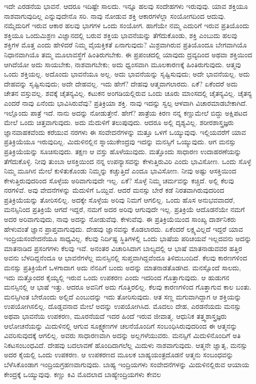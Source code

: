 ಇದೇ ಎರಡನೆಯ ಭಾವನೆ. ಆದರೂ ಇದಿಷ್ಟೇ ಸಾಲದು. ಇನ್ನೂ ಹಲವು ಸಂದೇಹಗಳು ಇರುವುವು. ಯಾವ ಶಕ್ತಿಯೂ ನಾಶವಾಗುವುದಿಲ್ಲ ಎನ್ನುವುದೇನೊ ಸರಿ. ನಾವು ನೋಡುವ ಶಕ್ತಿ ಆಕಾರಗಳೆಲ್ಲಾ ಸಂಯೋಗದಿಂದ ಆದುವು. ನಮ್ಮೆದುರಿಗೆ ಇರುವ ಆಕಾರ ಹಲವು ಭಾಗಗಳ ಒಂದು ಸಂಯೋಗ. ಹಾಗೆಯೇ ನಮ್ಮ ಎದುರಿಗೆ ಇರುವ ಪ್ರತಿಯೊಂದು ಶಕ್ತಿಯೂ ಒಂದುಮಿಶ್ರಣ ವಿಜ್ಞಾನದಲ್ಲಿ ಬರುವ ಶಕ್ತಿಯ ಭಾವನೆಯನ್ನು ತೆಗೆದುಕೊಂಡು, ಶಕ್ತಿ ಎಂಬುದು ಹಲವು ಶಕ್ತಿಗಳ ಮೊತ್ತ ಎಂದು ಹೇಳಿದರೆ ನಿಮ್ಮ ವೈಯಕ್ತಿಕತೆ ಏನಾಗುವುದು? ಮಿಶ್ರವಾಗಿರುವ ಪ್ರತಿಯೊಂದೂ ಬೇಗವಾಗಿಯೊ ನಿಧಾನವಾಗಿಯೊ ತಮ್ಮ ಮೂಲಾವಸ್ಥೆಗೆ ಹಿಂತಿರುಗಬೇಕು. ಈ ಪ್ರಪಂಚದಲ್ಲಿ ಯಾವುದು ದ್ರವ್ಯದಿಂದ ಅಥವಾ ಶಕ್ತಿಯಿಂದ ಆಗಿದೆಯೋ ಅದು ಸಾಯಬೇಕು, ನಾಶವಾಗಬೇಕು; ಅದು ಧ್ವಂಸವಾಗಿ ಮೂಲಕಾರಣಕ್ಕೆ ಹಿಂತಿರುಗುವುದು. ಆತ್ಮವು ಒಂದು ಶಕ್ತಿಯಲ್ಲ. ಅದೊಂದು ಭಾವನೆಯೂ ಅಲ್ಲ. ಅದು ಭಾವನೆಯನ್ನು ಸೃಷ್ಟಿಸುವುದು; ಅದೇ ಭಾವನೆಯಲ್ಲ. ಅದು ದೇಹವನ್ನು ಸೃಷ್ಟಿಸುವುದು; ಅದೇ ದೇಹವಲ್ಲ. ಇದು ಹೇಗೆ? ದೇಹವು ಆತ್ಮವಾಗಲಾರದು. ಏಕೆ? ಏಕೆಂದರೆ ಅದು ಚೇತನ ವಸ್ತುವಲ್ಲ. ಶವಕ್ಕೆ ಚೈತನ್ಯವಿಲ್ಲ. ಕಟುಕನ ಅಂಗಡಿಯಲ್ಲಿರುವ ಒಂದು ಚೂರು ಮಾಂಸದಲ್ಲಿ ಚೈತನ್ಯವಿಲ್ಲ. ಚೈತನ್ಯ ಎಂದರೆ ನಾವು ಏನೆಂದು ಭಾವಿಸಿರುವೆವು? ಪ್ರತಿಕ್ರಿಯಾ ಶಕ್ತಿ. ನಾವು ಇದನ್ನು ಸ್ವಲ್ಪ ಆಳವಾಗಿ ವಿಚಾರಮಾಡಬೇಕಾಗಿದೆ. ಇಲ್ಲೊಂದು ಪಾತ್ರೆ ಇದೆ. ನಾನು ಅದನ್ನು ನೋಡುತ್ತೇನೆ. ಹೇಗೆ? ಪಾತ್ರೆಯ ಕಿರಣ ನನ್ನ ಕಣ್ಣುಮೇಲೆ ಬಿದ್ದು ಅಕ್ಷಿಪಟದ ಮೇಲೆ ಒಂದು ಚಿತ್ತವಾಗುವುದು. ಅದು ಮೆದುಳಿಗೆ ತಲುಪುವುದು. ಆದರೂ ಅಲ್ಲಿ ದೃಶ್ಯವಿಲ್ಲ. ಶರೀರಶಾಸ್ತ್ರಜ್ಞರು ಜ್ಞಾನವಾಹಕವೆಂದು ಕರೆಯುವ ನರಗಳು ಈ ಸಂವೇದನೆಗಳನ್ನು ಮತ್ತೂ ಒಳಗೆ ಒಯ್ಯುವುವು. ಇಲ್ಲಿಯವರೆಗೆ ಯಾವ ಪ್ರತಿಕ್ರಿಯೆಯೂ ಇರುವುದಿಲ್ಲ. ಮಿದುಳಿನಲ್ಲಿನ ಸ್ನಾಯುಕೇಂದ್ರವು ಇದನ್ನು ಮನಸ್ಸಿಗೆ ಒಯ್ಯುವುದು. ಆಗ ಮನಸ್ಸು ಪ್ರತಿಕ್ರಿಯೆಯನ್ನು ಸೂಚಿಸುವುದು. ತಕ್ಷಣ ಆ ವಸ್ತು ಹೊಳೆಯುವುದು. ಮತ್ತೊಂದು ಸಾಧಾರಣ ಉದಾಹರಣೆಯನ್ನು ತೆಗೆದುಕೊಳ್ಳಿ. ನೀವು ತುಂಬಾ ಆಸಕ್ತಿಯಿಂದ ನನ್ನ ಉಪನ್ಯಾಸವನ್ನು ಕೇಳುತ್ತಿರುವಿರಿ ಎಂದು ಭಾವಿಸೋಣ. ಒಂದು ಸೊಳ್ಳೆ ನಿಮ್ಮ ಮೂಗಿನ ಮೇಲೆ ಕುಳಿತುಕೊಂಡು ನಿಮ್ಮನ್ನು ಕಚ್ಚುತ್ತಿದೆ ಎಂದೂ ಭಾವಿಸೋಣ. ನೀವು ಅಷ್ಟು ಆಸಕ್ತಿಯಿಂದ ಕೇಳುತ್ತಿರುವುದರಿಂದ ಸೊಳ್ಳೆಯ ಅರಿವಾಗುವುದೇ ಇಲ್ಲ. ಏಕೆ? ಸೊಳ್ಳೆ ನಿಮ್ಮ ಚರ್ಮವನ್ನು ಕಚ್ಚಿದೆ. ಅಲ್ಲಿ ಕೆಲವು ನರಗಳಿವೆ. ಅವು ವೇದನೆಗಳನ್ನು ಮೆದುಳಿಗೆ ಒಯ್ದಿವೆ. ಆದರೆ ಮನಸ್ಸು ಬೇರೆ ಕಡೆ ನಿರತವಾಗಿರುವುದರಿಂದ ಪ್ರತಿಕ್ರಿಯೆಯನ್ನು ತೋರಿಸಲಿಲ್ಲ. ಅದಕ್ಕೇ ಸೊಳ್ಳೆಯ ಅರಿವು ನಿಮಗೆ ಆಗಲಿಲ್ಲ. ಒಂದು ಹೊಸ ಅನುಭವವಾದರೆ, ಮನಸ್ಸಿನಿಂದ ಪ್ರತಿಕ್ರಿಯೆ ಆಗದೆ ಇದ್ದರೆ, ನಮಗೆ ಅದರ ಅರಿವು ಆಗುವುದೇ ಇಲ್ಲ. ಪ್ರತಿಕ್ರಿಯೆ ಆದೊಡನೆಯೇ ನಮಗೆ ಅದರ ಅರಿವಾಗುವುದು, ನಾವು ಅದನ್ನು ನೋಡುವೆವು. ಕೇಳುವೆವು. ಈ ಪ್ರತಿಕ್ರಿಯೆಯಿಂದ ಸಾಂಖ್ಯ ದಾರ್ಶನಿಕರು ಹೇಳುವಂತೆ ಜ್ಞಾನ ಪ್ರಾಪ್ತವಾಗುವುದು. ದೇಹವು ಜ್ಞಾನವನ್ನು ಕೊಡಲಾರದು. ಏಕೆಂದರೆ ಲಕ್ಷ್ಯವಿಲ್ಲದೆ ಇದ್ದರೆ ಯಾವ ಇಂದ್ರಿಯಸಂವೇದನೆಯೂ ಸಾಧ್ಯವಿಲ್ಲ. ಕೆಲವು ನಿರ್ದಿಷ್ಟ ಸ್ಥಿತಿಗಳಲ್ಲಿ ಒಂದು ಭಾಷೆಯ ಪರಿಚಯವೆ ಇಲ್ಲದವನು ಅದನ್ನು ಮಾತನಾಡಿದ ಪ್ರಸಂಗಗಳು ಕೆಲವು ಇವೆ. ಅನಂತರ ವಿಚಾರಿಸಿದಾಗ ಬಾಲ್ಯದಲ್ಲಿ ಆ ಭಾಷೆ ಮಾತನಾಡುವವರ ಹತ್ತಿರ ಅವನು ಬೆಳದಿದ್ದನೆಂದೂ ಆ ಭಾವನೆಗಳೆಲ್ಲ ಮನಸ್ಸಿನಲ್ಲಿ ಸುಪ್ತವಾಗಿದ್ದವೆಂದೂ ತಿಳಿದುಬಂದಿದೆ. ಕೆಲವು ಕಾರಣಗಳಿಂದ ಮನಸ್ಸು ಪ್ರತಿಕ್ರಿಯೆಗೆ ಒಳಗಾದಾಗ ಅದು ನೆನಪಿಗೆ ಬಂದು ಅದನ್ನು ಮಾತನಾಡತೊಡಗಿದ. ಮನಸ್ಸೊಂದೆ ಸಾಲದು, ಇದು ಮತ್ತೊಂದರ ಕೈಯ್ಯಲ್ಲಿ ಇರುವ ಒಂದು ಉಪಕರಣ ಎಂದು ಇದರಿಂದ ಗೊತ್ತಾಗುವುದು. ಆ ಹುಡುಗನ ಮನಸ್ಸಿನಲ್ಲಿ ಆ ಭಾಷೆ ಇತ್ತು. ಆದರೂ ಅವನಿಗೆ ಅದು ಗೊತ್ತಿರಲಿಲ್ಲ. ಕೆಲವು ಕಾರಣಗಳಿಂದ ಗೊತ್ತಾಗುವ ಕಾಲ ಬಂತು. ಮನಸ್ಸಿಗಿಂತ ಬೇರೊಂದು ಅಲ್ಲಿದೆ ಎಂಬುದನ್ನು ಇದು ತೋರಿಸುವುದು. ಆತ ಸಣ್ಣ ಮಗುವಾಗಿದ್ದಾಗ ಆ ಶಕ್ತಿಯನ್ನು ಉಪಯೋಗಿಸಲಿಲ್ಲ. ದೊಡ್ಡವನಾದ ಮೇಲೆ ಅದನ್ನು ಉಪಯೋಗಿಸಿದ. ಮೊದಲು ದೇಹ, ಎರಡನೆಯದು ಮನಸ್ಸು ಅಥವಾ ಭಾವನೆಯ ಉಪಕರಣ, ಮೂರನೆಯದೆ ಇದರ ಹಿಂದೆ ಇರುವ ಜೀವಾತ್ಮ. ಆಧುನಿಕ ತತ್ತ್ವಶಾಸ್ತ್ರಜ್ಞರು ಆಲೋಚನೆಯನ್ನು ಮಿದುಳಿನಲ್ಲಿ ಆಗುವ ಸೂಕ್ಷ್ಮಕಣಗಳ ಚಲನೆಯೊಂದಿಗೆ ಸಂಬಂಧಿಸಿರುವುದರಿಂದ ಈ ಆತ್ಮನನ್ನು ವಿವರಿಸುವುದಕ್ಕೆ ಆಗಲಿಲ್ಲ. ಅವರು ಸಾಧಾರಣವಾಗಿ ಅದನ್ನು ಅಲ್ಲಗಳೆಯುವರು. ಮನಸ್ಸಿಗೆ ಮಿದುಳಿನೊಂದಿಗೆ ಅತಿ ನಿಕಟಸಂಬಂಧವಿದೆ. ದೇಹವು ಬದಲಾವಣೆ ಹೊಂದಿದಾಗಲೆಲ್ಲ ಮಿದುಳು ನಾಶವಾಗುವುದು. ಆತ್ಮನೇ ಜ್ಞಾತೃ, ಮನಸ್ಸು ಅದರ ಕೈಯಲ್ಲಿ ಒಂದು ಉಪಕರಣ. ಆ ಉಪಕರಣದ ಮೂಲಕ ಬಾಹ್ಯಯಂತ್ರದೊಡನೆ ಆತ್ಮನು ಸಂಬಂಧವನ್ನು ಬೆಳೆಸಿಕೊಂಡಾಗ ಇಂದ್ರಿಯಗ್ರಹಣವಾಗುವುದು. ಬಾಹ್ಯ ಇಂದ್ರಿಯಗಳು ಸಂವೇದನೆಗಳನ್ನು ಮಿದುಳಿನಲ್ಲಿರುವ ಆಯಾಯ ಕೇಂದ್ರಕ್ಕೆ ಒಯ್ಯುವುವು. ಕಣ್ಣು ಕಿವಿ ಮೊದಲಾದ ಬಾಹ್ಯೇಂದ್ರಿಯಗಳು ಕೇವಲ 